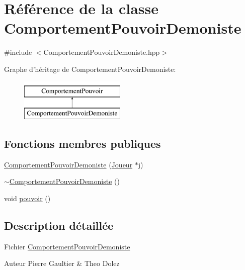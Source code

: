 \hypertarget{class_comportement_pouvoir_demoniste}{\section{Référence de la classe Comportement\-Pouvoir\-Demoniste}
\label{class_comportement_pouvoir_demoniste}
}


{\ttfamily \#include $<$Comportement\-Pouvoir\-Demoniste.\-hpp$>$}

Graphe d'héritage de Comportement\-Pouvoir\-Demoniste\-:\begin{figure}[H]
\begin{center}
\leavevmode
\includegraphics[height=2.000000cm]{class_comportement_pouvoir_demoniste}
\end{center}
\end{figure}
\subsection*{Fonctions membres publiques}
\begin{DoxyCompactItemize}
\item 
\hyperlink{class_comportement_pouvoir_demoniste_a1f6b2e5586c6c0e48cd2d88be22e730a}{Comportement\-Pouvoir\-Demoniste} (\hyperlink{class_joueur}{Joueur} $\ast$j)
\item 
\hyperlink{class_comportement_pouvoir_demoniste_a95cd36e0a6e6b10c9931ca1f4b9daad8}{$\sim$\-Comportement\-Pouvoir\-Demoniste} ()
\item 
void \hyperlink{class_comportement_pouvoir_demoniste_a85abc906021128b61ba1c292921c411d}{pouvoir} ()
\end{DoxyCompactItemize}


\subsection{Description détaillée}
Fichier \hyperlink{class_comportement_pouvoir_demoniste}{Comportement\-Pouvoir\-Demoniste} \begin{DoxyAuthor}{Auteur}
Pierre Gaultier \& Theo Dolez 
\end{DoxyAuthor}


